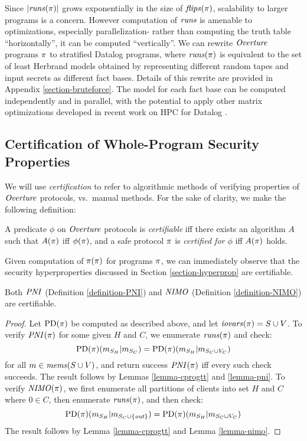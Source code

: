 Since $|\mathit{runs}(\pi)|$ grows exponentially in the size of
$\mathit{flips}(\pi)$, scalability to larger programs is a concern.  However
computation of $\mathit{runs}$ is amenable to optimizations, especially
parallelization- rather than computing the truth table
``horizontally'', it can be computed ``vertically''. We can rewrite
$\mathit{Overture}$ programs $\pi$ to stratified Datalog programs, where
$\mathit{runs}(\pi)$ is equivalent to the set of least Herbrand models obtained
by representing different random tapes and input secrets as different
fact bases. Details of this rewrite are provided in Appendix
\ref{section-bruteforce}. The model for each fact base can be computed
independently and in parallel, with the potential to apply other
matrix optimizations developed in recent work on HPC for Datalog
\cite{sakama2017linear,aspis2018linear,nguyen2022enhancing,nguyen2021efficient}.

\subsection{Certification of Whole-Program Security Properties}
\label{section-automation-extensional}

We will use \emph{certification} to refer to algorithmic methods of
verifying properties of $\mathit{Overture}$ protocols, vs.~manual methods. For
the sake of clarity, we make the following definition:
\begin{definition}
  A predicate $\phi$ on $\mathit{Overture}$ protocols is \emph{certifiable} iff
  there exists an algorithm $A$ such that $A(\pi)$ iff $\phi(\pi)$,
  and a safe protocol $\pi$ is \emph{certified for $\phi$} iff
  $A(\pi)$ holds.
\end{definition}

Given computation of $\pi(\pi)$ for programs $\pi$, we can
immediately observe that the security hyperproperties discussed in
Section \ref{section-hyperprop} are certifiable.
\begin{lemma}
  Both $\mathit{PNI}$ (Definition \ref{definition-PNI}) and $\mathit{NIMO}$ (Definition \ref{definition-NIMO}) are certifiable. 
\end{lemma}

\begin{proof}
  Let $\mathrm{PD}(\pi)$ be computed as described above, and let $\mathit{iovars}(\pi) = S
  \cup V$. To verify $\mathit{PNI}(\pi)$ for
  some given $H$ and $C$, we enumerate $\mathit{runs}(\pi)$ and check:
  $$
  \mathrm{PD}(\pi)(m_{S_H}|m_{S_C}) =
  \mathrm{PD}(\pi)(m_{S_H}|m_{S_C \cup V_C})
  $$
  for all $m \in \mathit{mems}(S \cup V)$, and return success $\mathit{PNI}(\pi)$ iff every such
  check succeeds. The result follows by Lemmas \ref{lemma-cprogtt} and \ref{lemma-pni}.
  To verify $\mathit{NIMO}(\pi)$, we first enumerate all partitions of clients
  into set $H$ and $C$ where $0 \in C$, then enumerate $\mathit{runs}(\pi)$, and
  then check:
  $$
  \mathrm{PD}(\pi)(m_{S_H}|m_{S_C \cup \{\mathit{out}\}}) =
  \mathrm{PD}(\pi)(m_{S_H}|m_{S_C \cup V_C})
  $$
  The result follows by Lemma \ref{lemma-cprogtt} and Lemma \ref{lemma-nimo}.
\end{proof}

